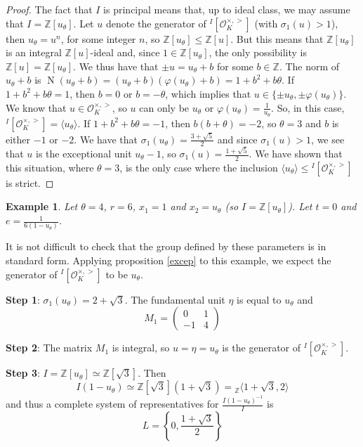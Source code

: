 \documentclass[12pt]{amsart}
\newtheorem{example}{Example}[section]
\newcommand{\Z}{\mathbb{Z}}
\newcommand{\OO}{\mathcal{O}}
\DeclareMathOperator{\Norm}{N}
\begin{document}
\begin{proof}
The fact that $I$ is principal means that, up to ideal class, we may assume that $I = \Z[u_\theta]$. Let $u$ denote the generator of ${}^I[\OO_K^{\times,>}]$ (with $\sigma_1(u)>1$), then $u_\theta = u^n$, for some integer $n$, so $\Z[u_\theta]\leq \Z[u]$. But this means that $\Z[u_\theta]$ is an integral $\Z[u]$-ideal and, since $1 \in \Z[u_\theta]$, the only possibility is $\Z[u]=\Z[u_\theta]$. We thus have that $\pm u = u_\theta + b$ for some $b \in \Z$. The norm of $u_\theta + b$ is $\Norm(u_\theta + b)= (u_\theta + b)(\varphi(u_\theta)+b)= 1 + b^2 + b\theta$. If $1+b^2+b\theta = 1$, then $b=0$ or $b= -\theta$, which implies that $u \in \{\pm u_\theta, \pm \varphi(u_\theta)\}$. We know that $u \in \OO_K^{\times, >}$, so $u$ can only be $u_\theta$ or $\varphi(u_\theta)= \frac{1}{u_\theta}$. So, in this case, ${}^I[\OO_K^{\times, >}]= \langle u_\theta\rangle$. If $1+b^2+b\theta=-1$, then $b(b+\theta)= -2$, so $\theta = 3$ and $b$ is either $-1$ or $-2$. We have that $\sigma_1(u_\theta)=\frac{3+\sqrt{5}}{2}$ and since $\sigma_1(u)>1$, we see that $u$ is the exceptional unit $u_\theta -1$, so $\sigma_1(u)=\frac{1+\sqrt{5}}{2}$. We have shown that this situation, where $\theta = 3$, is the only case where the inclusion $\langle u_\theta \rangle \leq {}^I[\OO_K^{\times, >}]$ is strict. \end{proof}

\begin{example}\label{ex2} Let $\theta = 4$, $r = 6$, $x_1 = 1$ and $ x_2 = u_\theta$ (so $I = \Z[u_\theta]$). Let $t=0$ and $e= \frac{1}{6(1-u_\theta)}$.
\end{example}
\noindent
It is not difficult to check that the group defined by these parameters is in standard form. Applying proposition \ref{excep} to this example, we expect the generator of ${}^I[\OO_K^{\times, >}]$ to be $u_\theta$.\par

\noindent
{\bf Step 1}: $\sigma_1(u_\theta)=2+\sqrt{3}$. The fundamental unit $\eta$ is equal to $u_\theta$ and 
$$M_1=
\begin{pmatrix}
0 & 1\\
-1 & 4
\end{pmatrix}$$

\noindent
{\bf Step 2}: The matrix $M_1$ is integral, so $u=\eta=u_\theta$ is the generator of ${}^I[\OO_K^{\times, >}]$.\par

\noindent
{\bf Step 3}: $I = \Z[u_\theta]\simeq \Z[\sqrt{3}]$. Then 
$$I(1-u_\theta)\simeq \Z[\sqrt{3}](1+\sqrt{3})={}_\Z\langle1+\sqrt{3},2\rangle$$
and thus a complete system of representatives for $\frac{I(1-u_\theta)^{-1}}{I}$ is
$$L = \left\{0, \frac{1+\sqrt{3}}{2}\right\}$$
\end{document}
